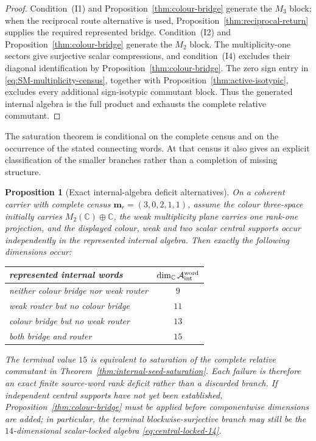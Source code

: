 \documentclass[11pt]{article}
\numberwithin{equation}{section}
\newtheorem{proposition}[theorem]{Proposition}
\theoremstyle{definition}
\theoremstyle{remark}
\newcommand{\C}{\mathbb C}
\newcommand{\A}{\mathcal A}
\begin{document}
\begin{proof}
Condition~\textup{(I1)} and Proposition~\ref{thm:colour-bridge} generate the
$M_3$ block; when the reciprocal route alternative is used,
Proposition~\ref{thm:reciprocal-return} supplies the required represented bridge.
Condition~\textup{(I2)} and Proposition~\ref{thm:colour-bridge} generate the $M_2$ block.
The multiplicity-one sectors give surjective scalar compressions, and
condition~\textup{(I4)} excludes their diagonal identification by
Proposition~\ref{thm:colour-bridge}.  The zero sign entry in
\eqref{eq:SM-multiplicity-census}, together with
Proposition~\ref{thm:active-isotypic}, excludes every additional
sign-isotypic commutant block.  Thus the generated internal algebra is the
full product and exhausts the complete relative commutant.
\end{proof}

The saturation theorem is conditional on the complete census and on the
occurrence of the stated connecting words.  At that census it also gives
an explicit classification of the smaller branches rather than a completion
of missing structure.

\begin{proposition}[Exact internal-algebra deficit alternatives]
\label{thm:internal-deficit-alternatives}
On a coherent carrier with complete census $\bm m_r=(3,0,2,1,1)$, assume the colour
three-space initially carries $M_2(\C)\oplus\C$, the weak multiplicity plane
carries one rank-one projection, and the displayed colour, weak and two scalar
central supports occur independently in the represented internal algebra.
Then exactly the following dimensions occur:
\begin{center}
\begin{tabular}{L{0.47\textwidth}c}
\toprule
represented internal words & $\dim_\C\A_{\rm int}^{\rm word}$\\\midrule
neither colour bridge nor weak router & $9$\\
weak router but no colour bridge & $11$\\
colour bridge but no weak router & $13$\\
both bridge and router & $15$\\
\bottomrule
\end{tabular}
\end{center}
The terminal value $15$ is equivalent to saturation of the complete relative
commutant in Theorem~\ref{thm:internal-seed-saturation}.  Each failure is
therefore an exact finite source-word rank deficit rather than a discarded
branch.  If independent central supports have not yet been established,
Proposition~\ref{thm:colour-bridge} must be applied before componentwise
dimensions are added; in particular, the terminal blockwise-surjective branch
may still be the $14$-dimensional scalar-locked algebra
\eqref{eq:central-locked-14}.
\end{proposition}
\end{document}
